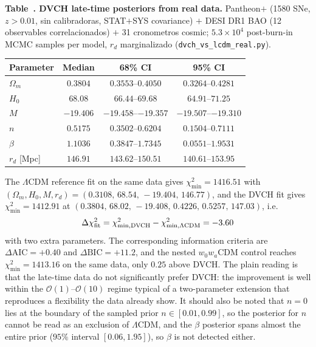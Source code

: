 \documentclass[pdflatex,sn-mathphys-num]{sn-jnl}%
\begin{document}
\begin{center}
\label{tab:latetime_mcmc}
\begin{minipage}{0.98\linewidth}
\centering
\footnotesize
\textbf{Table~\thetable. DVCH late-time posteriors from real data.}
Pantheon$+$ (1580 SNe, $z>0.01$, sin calibradoras, STAT$+$SYS covariance) $+$
DESI DR1 BAO (12 observables correlacionados) $+$ 31 cronometros cosmic;
$5.3\times10^4$ post-burn-in MCMC samples per model, $r_d$ marginalizado
(\texttt{dvch\_vs\_lcdm\_real.py}).
\begin{tabular}{lccc}
\toprule
Parameter & Median & 68\% CI & 95\% CI \\
\midrule
$\Omega_m$ & $0.3804$ & $0.3553$--$0.4050$ & $0.3264$--$0.4281$ \\
$H_0$      & $68.08$  & $66.44$--$69.68$   & $64.91$--$71.25$ \\
$M$        & $-19.406$ & $-19.458$--$-19.357$ & $-19.507$--$-19.310$ \\
$n$        & $0.5175$ & $0.3502$--$0.6204$ & $0.1504$--$0.7111$ \\
$\beta$    & $1.1036$ & $0.3847$--$1.7345$ & $0.0551$--$1.9531$ \\
$r_d$ [Mpc] & $146.91$ & $143.62$--$150.51$ & $140.61$--$153.95$ \\
\bottomrule
\end{tabular}
\end{minipage}
\end{center}

The $\Lambda$CDM reference fit on the same data gives $\chi^2_{\min}=1416.51$
with $(\Omega_m,H_0,M,r_d)=(0.3108,\,68.54,\,-19.404,\,146.77)$, and the
DVCH fit gives $\chi^2_{\min}=1412.91$ at
$(0.3804,\,68.02,\,-19.408,\,0.4226,\,0.5257,\,147.03)$, i.e.
\begin{equation}
\Delta\chi^2_{\rm fit} = \chi^2_{\min,\rm DVCH} - \chi^2_{\min,\Lambda\rm CDM}
= -3.60
\label{eq:dchi2_latetime}
\end{equation}
with two extra parameters. The corresponding information criteria are
$\Delta\mathrm{AIC}=+0.40$ and $\Delta\mathrm{BIC}=+11.2$, and the nested
$w_0w_a$CDM control reaches $\chi^2_{\min}=1413.16$ on the same data, only
$0.25$ above DVCH. The plain reading is that the late-time data do not
significantly prefer DVCH: the improvement is well within the
$\mathcal{O}(1)$--$\mathcal{O}(10)$ regime typical of a two-parameter
extension that reproduces a flexibility the data already show. It should
also be noted that $n=0$ lies at the boundary of the sampled prior
$n\in[0.01,0.99]$, so the posterior for $n$ cannot be read as an exclusion
of $\Lambda$CDM, and the $\beta$ posterior spans almost the entire prior
($95\%$ interval $[0.06,1.95]$), so $\beta$ is not detected either.
\end{document}
